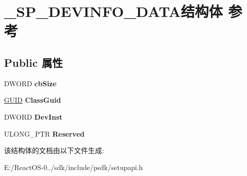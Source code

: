 \hypertarget{struct___s_p___d_e_v_i_n_f_o___d_a_t_a}{}\section{\+\_\+\+S\+P\+\_\+\+D\+E\+V\+I\+N\+F\+O\+\_\+\+D\+A\+T\+A结构体 参考}
\label{struct___s_p___d_e_v_i_n_f_o___d_a_t_a}
\subsection*{Public 属性}
\begin{DoxyCompactItemize}
\item 
\mbox{\label{struct___s_p___d_e_v_i_n_f_o___d_a_t_a_a5401c291f6fc51d9726e326074703775}} 
D\+W\+O\+RD {\bfseries cb\+Size}
\item 
\mbox{\label{struct___s_p___d_e_v_i_n_f_o___d_a_t_a_a03a1a8410d485fea1c8607395b665698}} 
\hyperlink{interface_g_u_i_d}{G\+U\+ID} {\bfseries Class\+Guid}
\item 
\mbox{\label{struct___s_p___d_e_v_i_n_f_o___d_a_t_a_a0b6628240057845920d52c5e50de5f47}} 
D\+W\+O\+RD {\bfseries Dev\+Inst}
\item 
\mbox{\label{struct___s_p___d_e_v_i_n_f_o___d_a_t_a_a21bc1132a729da53b24134227da8979e}} 
U\+L\+O\+N\+G\+\_\+\+P\+TR {\bfseries Reserved}
\end{DoxyCompactItemize}


该结构体的文档由以下文件生成\+:\begin{DoxyCompactItemize}
\item 
E\+:/\+React\+O\+S-\/0../sdk/include/psdk/setupapi.\+h\end{DoxyCompactItemize}
